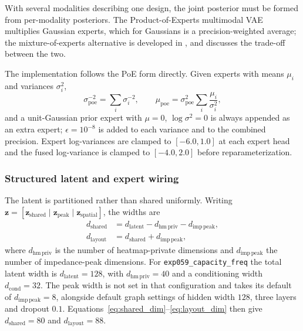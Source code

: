 With several modalities describing one design, the joint posterior must be formed
from per-modality posteriors. The Product-of-Experts multimodal VAE
\cite{wu2018mvae} multiplies Gaussian experts, which for Gaussians is a
precision-weighted average; the mixture-of-experts alternative is developed in
\cite{shi2019mmvae}, and \cite{kutuzova2021defense} discusses the trade-off
between the two.

The implementation follows the PoE form directly. Given experts with means
$\mu_i$ and variances $\sigma_i^2$,
\begin{equation}
\sigma^{-2}_{\mathrm{poe}} = \sum_i \sigma_i^{-2},
\qquad
\mu_{\mathrm{poe}} = \sigma^{2}_{\mathrm{poe}} \sum_i \frac{\mu_i}{\sigma_i^{2}},
\label{eq:poe}
\end{equation}
and a unit-Gaussian prior expert with $\mu = 0$, $\log \sigma^2 = 0$ is always
appended as an extra expert; $\epsilon = 10^{-8}$ is added to each variance and
to the combined precision. Expert log-variances are clamped to $[-6.0, 1.0]$ at
each expert head and the fused log-variance is clamped to $[-4.0, 2.0]$ before
reparameterization.


\subsubsection*{Structured latent and expert wiring}

The latent is partitioned rather than shared uniformly. Writing
$\mathbf{z} = [\mathbf{z}_{\mathrm{shared}} \mid \mathbf{z}_{\mathrm{peak}} \mid \mathbf{z}_{\mathrm{spatial}}]$,
the widths are
\begin{align}
d_{\mathrm{shared}} &= d_{\mathrm{latent}} - d_{\mathrm{hm\,priv}} - d_{\mathrm{imp\,peak}},
\label{eq:shared_dim}\\
d_{\mathrm{layout}} &= d_{\mathrm{shared}} + d_{\mathrm{imp\,peak}},
\label{eq:layout_dim}
\end{align}
where $d_{\mathrm{hm\,priv}}$ is the number of heatmap-private dimensions and
$d_{\mathrm{imp\,peak}}$ the number of impedance-peak dimensions. For
\texttt{exp059\_capacity\_freq} the total latent width is
$d_{\mathrm{latent}} = 128$, with $d_{\mathrm{hm\,priv}} = 40$ and a
conditioning width $d_{\mathrm{cond}} = 32$. The peak width is not set in that
configuration and takes its default of $d_{\mathrm{imp\,peak}} = 8$, alongside
default graph settings of hidden width $128$, three layers and dropout $0.1$.
Equations~\ref{eq:shared_dim}--\ref{eq:layout_dim} then give
$d_{\mathrm{shared}} = 80$ and $d_{\mathrm{layout}} = 88$.


